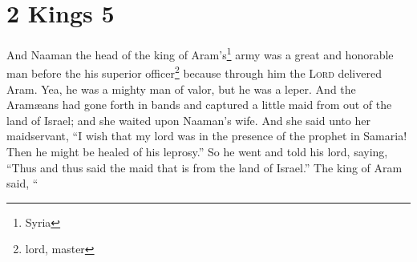 \section{2 Kings 5}\label{2 Kings 5}
\begin{enumerate}
     And Naaman the head of the king of Aram's\footnote{Syria} army was a great and honorable man before the his superior officer\footnote{lord, master} because through him the \textsc{Lord} delivered Aram. Yea, he was a mighty man of valor, but he was a leper.%
     And the Aram\ae{}ans had gone forth in bands and captured a little maid from out of the land of Israel; and she waited upon Naaman's wife.%
     And she said unto her maidservant, ``I wish that my lord was in the presence of the prophet in Samaria! Then he might be healed of his leprosy.''%
     So he went and told his lord, saying, ``Thus and thus said the maid that is from the land of Israel.''%
     The king of Aram said, ``%
\end{enumerate}
